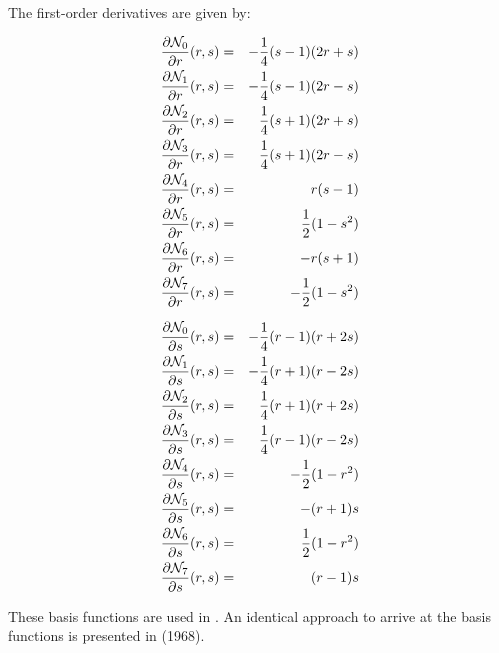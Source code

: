 The first-order derivatives are given by:

\begin{mdframed}[backgroundcolor=blue!5]
\begin{eqnarray}
\frac{\partial {\mathcal{N}}_0}{\partial r}(r,s)&=& -\frac{1}{4}(s-1)(2r+s)  \\
\frac{\partial {\mathcal{N}}_1}{\partial r}(r,s)&=& -\frac{1}{4}(s-1)(2r-s)  \\
\frac{\partial {\mathcal{N}}_2}{\partial r}(r,s)&=& \frac{1}{4}(s+1)(2r+s)  \\
\frac{\partial {\mathcal{N}}_3}{\partial r}(r,s)&=& \frac{1}{4}(s+1)(2r-s)  \\
\frac{\partial {\mathcal{N}}_4}{\partial r}(r,s)&=& r(s-1)  \\
\frac{\partial {\mathcal{N}}_5}{\partial r}(r,s)&=& \frac{1}{2} (1-s^2)  \\
\frac{\partial {\mathcal{N}}_6}{\partial r}(r,s)&=& -r(s+1)  \\
\frac{\partial {\mathcal{N}}_7}{\partial r}(r,s)&=& -\frac{1}{2} (1-s^2)  
\end{eqnarray}
\end{mdframed}

\begin{mdframed}[backgroundcolor=blue!5]
\begin{eqnarray}
\frac{\partial {\mathcal{N}}_0}{\partial s}(r,s)&=& -\frac{1}{4}(r-1)(r+2s) \\
\frac{\partial {\mathcal{N}}_1}{\partial s}(r,s)&=& -\frac{1}{4}(r+1)(r-2s) \\
\frac{\partial {\mathcal{N}}_2}{\partial s}(r,s)&=&  \frac{1}{4}(r+1)(r+2s) \\
\frac{\partial {\mathcal{N}}_3}{\partial s}(r,s)&=&  \frac{1}{4}(r-1)(r-2s) \\
\frac{\partial {\mathcal{N}}_4}{\partial s}(r,s)&=& - \frac{1}{2}(1-r^2)\\
\frac{\partial {\mathcal{N}}_5}{\partial s}(r,s)&=&  -(r+1)s \\
\frac{\partial {\mathcal{N}}_6}{\partial s}(r,s)&=& \frac{1}{2} (1-r^2)\\
\frac{\partial {\mathcal{N}}_7}{\partial s}(r,s)&=&  (r-1)s
\end{eqnarray}
\end{mdframed}
These basis functions are used in .
An identical approach to arrive at the basis functions is presented in 
\textcite{eriz68} (1968).
